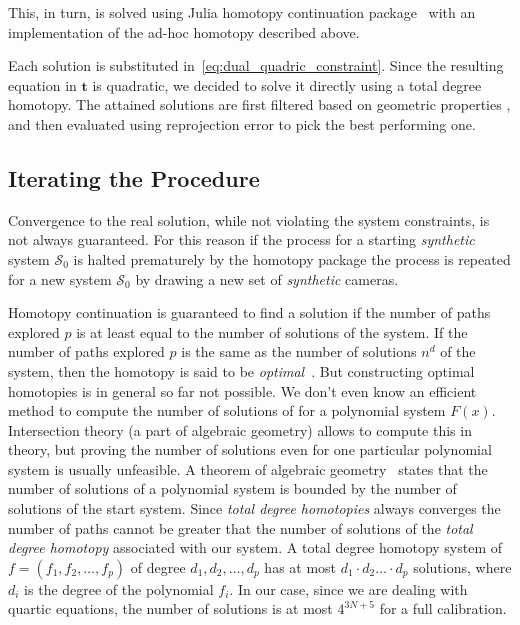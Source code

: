 This, in turn, is solved using Julia homotopy continuation package~\cite{HomotopyContinuationJL} with an implementation of the ad-hoc homotopy described above.

Each solution is substituted in~\eqref{eq:dual_quadric_constraint}. Since the resulting equation in $\mathbf{t}$ is quadratic, we decided to solve it directly using a total degree homotopy. The attained solutions are first filtered based on geometric properties , and then evaluated using reprojection error to pick the best performing one.

\subsection{Iterating the Procedure}
\label{sec:iterating_procedure}

Convergence to the real solution, while not violating the system constraints, is not always guaranteed. For this reason if the process for a starting \emph{synthetic} system $\mathcal{S}_0$ is halted prematurely by the homotopy package the process is repeated for a new system $\mathcal{S}_0$ by drawing a new set of \emph{synthetic} cameras.

Homotopy continuation is guaranteed to find a solution if the number of paths explored $p$ is at least equal to the number of solutions of the system.
If the number of paths explored $p$ is the same as the number of solutions $n^d$ of the system, then the homotopy is said to be \emph{optimal}~\cite{HomotophyContinuationMethods}. But constructing optimal homotopies is in general so far not possible. We don't even know an efficient method to compute the number of solutions of for a polynomial system $F(x)$. Intersection theory (a part of algebraic geometry) \cite{khovanskii2011faa4} allows to compute this in theory, but proving the number of solutions even for one particular polynomial system is usually unfeasible.
A theorem of algebraic geometry~\cite{HomotophyContinuationMethods} states that the number of solutions of a polynomial system is bounded by the number of solutions of the start system. Since \emph{total degree homotopies} always converges the number of paths cannot be greater that the number of solutions of the \emph{total degree homotopy} associated with our system. A total degree homotopy system of $f = (f_1, f_2, \ldots, f_p)$ of degree $d_1, d_2, \ldots, d_p$ has at most $d_1 \cdot d_2 \ldots \cdot d_p$ solutions, where $d_i$ is the degree of the polynomial $f_i$. In our case, since we are dealing with quartic equations, the number of solutions is at most $4^{3N + 5}$ for a full calibration.

